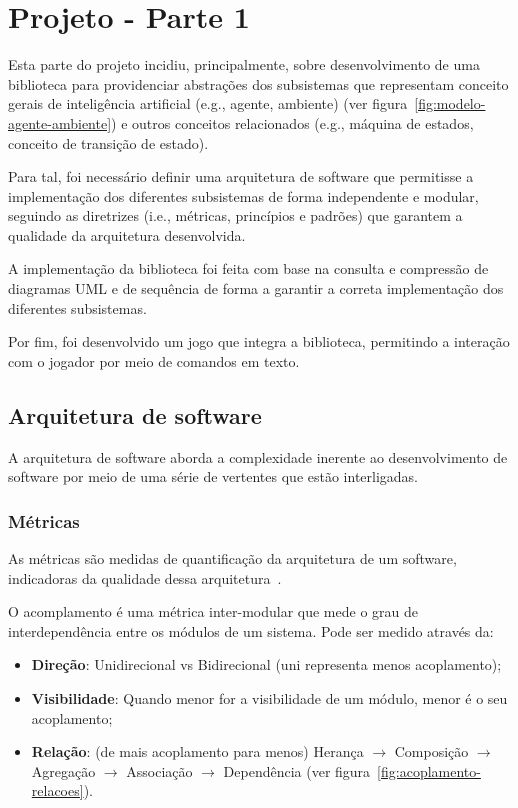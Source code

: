 \chapter{Projeto - Parte 1} \label{ch:projeto-parte1}

Esta parte do projeto incidiu, principalmente, sobre desenvolvimento de uma biblioteca para providenciar abstrações dos subsistemas que representam conceito gerais de inteligência artificial (e.g., agente, ambiente) (ver figura~\ref{fig:modelo-agente-ambiente}) e outros conceitos relacionados (e.g., máquina de estados, conceito de transição de estado).

Para tal, foi necessário definir uma arquitetura de software que permitisse a implementação dos diferentes subsistemas de forma independente e modular, seguindo as diretrizes (i.e., métricas, princípios e padrões) que garantem a qualidade da arquitetura desenvolvida.

A implementação da biblioteca foi feita com base na consulta e compressão de diagramas UML e de sequência de forma a garantir a correta implementação dos diferentes subsistemas.

Por fim, foi desenvolvido um jogo que integra a biblioteca, permitindo a interação com o jogador por meio de comandos em texto.


\section{Arquitetura de software}\label{sec:arquitetura-de-software}

A arquitetura de software aborda a complexidade inerente ao desenvolvimento de software por meio de uma série de vertentes que estão interligadas.

\subsection{Métricas}\label{subsec:metricas}

As métricas são medidas de quantificação da arquitetura de um software, indicadoras da qualidade dessa arquitetura~\cite{isel:iasa:slides:intro-eng-soft-parte-2}.

O acomplamento é uma métrica inter-modular que mede o grau de interdependência entre os módulos de um sistema. Pode ser medido através da:
\begin{itemize}
    \item \textbf{Direção}: Unidirecional vs Bidirecional (uni representa menos acoplamento);
    \item \textbf{Visibilidade}: Quando menor for a visibilidade de um módulo, menor é o seu acoplamento;
    \item \textbf{Relação}: (de mais acoplamento para menos) Herança $\rightarrow$ Composição $\rightarrow$ Agregação $\rightarrow$ Associação $\rightarrow$ Dependência (ver figura~\ref{fig:acoplamento-relacoes}).
\end{itemize}

